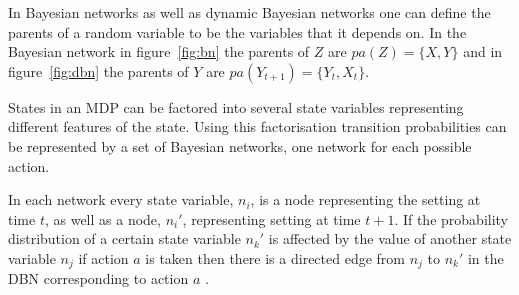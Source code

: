In Bayesian networks as well as dynamic Bayesian networks one can define the
parents of a random variable to be the variables that it depends on. In the
Bayesian network in figure~\ref{fig:bn} the parents of $Z$ are $pa(Z) = \{X,
Y\}$ and in figure~\ref{fig:dbn} the parents of $Y$ are $pa(Y_{t+1}) = \{Y_t,
X_t\}$.

States in an MDP can be factored into several state variables representing
different features of the state. Using this factorisation transition
probabilities can be represented by a set of Bayesian networks, one network for
each possible action. 

In each network every state variable, $n_i$, is a node representing the setting
at time $t$, as well as a node, $n_i'$, representing setting at time $t+1$. If
the probability distribution of a certain state variable $n_k'$ is affected by
the value of another state variable $n_j$ if action $a$ is taken then there is
a directed edge from $n_j$ to $n_k'$ in the DBN corresponding to action $a$
\parencite{guestrin2003efficient}.
